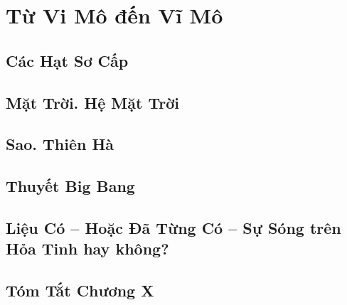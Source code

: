 \documentclass{article}
\numberwithin{equation}{section}
\begin{document}

\section{Từ Vi Mô đến Vĩ Mô}

\subsection{Các Hạt Sơ Cấp}


\subsection{Mặt Trời. Hệ Mặt Trời}


\subsection{Sao. Thiên Hà}


\subsection{Thuyết Big Bang}


\subsection{Liệu Có -- Hoặc Đã Từng Có -- Sự Sóng trên Hỏa Tinh hay không?}

\subsection{Tóm Tắt Chương X}


\newpage
\printbibliography[heading=bibintoc]
	
\end{document}
